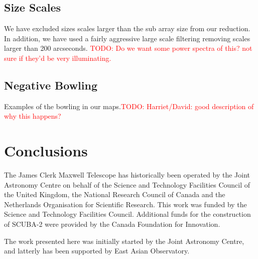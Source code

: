 \documentclass[twocolumn]{aastex6}
\newcommand{\todo}[1]{\textcolor{red}{TODO: #1}}
\begin{document}
\subsection{Size Scales}
We have excluded sizes scales larger than the sub array size from our
reduction. In addition, we have used a fairly aggressive large scale
filtering removing scales larger than 200 arcseconds.
\todo{Do we want some power spectra of this? not sure if they'd be very illuminating.}

\subsection{Negative Bowling}
Examples of the bowling in our maps.\todo{Harriet/David: good description of why this happens?}





\section{Conclusions}

\acknowledgments

The James Clerk Maxwell Telescope has historically been operated by
the Joint Astronomy Centre on behalf of the Science and Technology
Facilities Council of the United Kingdom, the National Research
Council of Canada and the Netherlands Organisation for Scientific
Research. This work was funded by the Science and Technology
Facilities Council.  Additional funds for the construction of SCUBA-2
were provided by the Canada Foundation for Innovation.

The work presented here was initially started by the Joint Astronomy
Centre, and latterly has been supported by East Asian Observatory.


\vspace{5mm}

\end{document}
